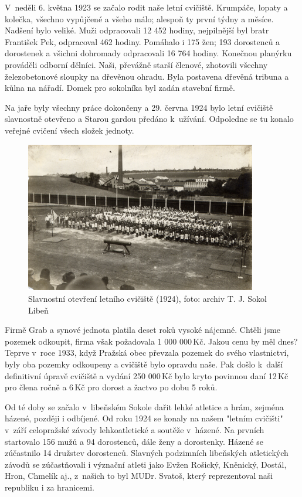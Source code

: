 \documentclass[a5paper, 11pt, twoside]{article}
\begin{document}
V~neděli 6. května 1923 se začalo rodit naše letní cvičiště. Krumpáče,
lopaty a kolečka, všechno vypůjčené a všeho málo; alespoň ty první týdny
a měsíce. Nadšení bylo veliké. Muži odpracovali 12 452 hodiny,
nejpilnější byl bratr František Pek, odpracoval 462 hodiny. Pomáhalo i
175 žen; 193 dorostenců a dorostenek a všichni dohromady odpracovali 16
764 hodiny. Konečnou planýrku prováděli odborní dělníci. Naši, převážně
starší členové, zhotovili všechny železobetonové sloupky na dřevěnou
ohradu. Byla postavena dřevěná tribuna a kůlna na nářadí. Domek pro
sokolníka byl zadán stavební firmě.

Na jaře byly všechny práce dokončeny a 29. června 1924 bylo letní
cvičiště slavnostně otevřeno a Starou gardou předáno k~užívání.
Odpoledne se tu konalo veřejné cvičení všech složek jednoty.

\begin{figure}[h!]
  \centering 
  \includegraphics[width=0.9\textwidth]{img/26_otevreni_cviciste.jpg}
  \caption*{Slavnostní otevření letního cvičiště (1924), foto: archiv T. J.
  Sokol Libeň}
\end{figure}

Firmě Grab a synové jednota platila deset roků vysoké nájemné. Chtěli
jsme pozemek odkoupit, firma však požadovala 1 000 000\,Kč. Jakou cenu by
měl dnes? Teprve v~roce 1933, když Pražská obec převzala pozemek do
svého vlastnictví, byly oba pozemky odkoupeny a cvičiště bylo opravdu
naše. Pak došlo k~další definitivní úpravě cvičiště a vydání 250 000\,Kč
bylo kryto povinnou daní 12\,Kč pro člena ročně a 6\,Kč pro dorost a
žactvo po dobu 5 roků.

Od té doby se začalo v~libeňském Sokole dařit lehké atletice a hrám,
zejména házené, později i odbíjené. Od roku 1924 se konaly na našem
"letním cvičišti" v~září celopražské závody lehkoatletické a soutěže
v~házené. Na prvních startovalo 156 mužů a 94 dorostenců, dále ženy a
dorostenky. Házené se zúčastnilo 14 družstev dorostenců. Slavných
podzimních libeňských atletických závodů se zúčastňovali i význační
atleti jako Evžen Rošický, Kněnický, Dostál, Hron, Chmelík aj., z~našich
to byl MUDr. Svatoš, který reprezentoval naši republiku i za hranicemi.
\end{document}
